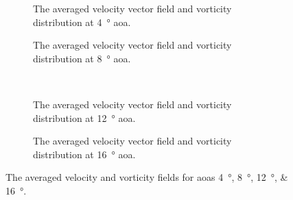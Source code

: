 \begin{figure}[htbp]
    \centering
    \begin{subfigure}{0.49\textwidth}
        \centering
        
        \caption{The averaged velocity vector field and vorticity distribution at \qty{4}{\degree} \acrshort{aoa}.}
        \label{fig:averaged_piv_aoa4}
    \end{subfigure}
    \begin{subfigure}{0.49\textwidth}
        \centering
        
        \caption{The averaged velocity vector field and vorticity distribution at \qty{8}{\degree} \acrshort{aoa}.}
        \label{fig:averaged_piv_aoa8}
    \end{subfigure} \\
    \begin{subfigure}{0.49\textwidth}
        \centering
        
        \caption{The averaged velocity vector field and vorticity distribution at \qty{12}{\degree} \acrshort{aoa}.}
        \label{fig:averaged_piv_aoa12}
    \end{subfigure}
    \begin{subfigure}{0.49\textwidth}
        \centering
        
        \caption{The averaged velocity vector field and vorticity distribution at \qty{16}{\degree} \acrshort{aoa}.}
        \label{fig:averaged_piv_aoa16}
    \end{subfigure}
    \caption{The averaged velocity and vorticity fields for \acrshort{aoa}s \qtylist{4;8;12;16}{\degree}.}
    \label{fig:averaged_piv}
    \vspace*{3.5in}
\end{figure}

